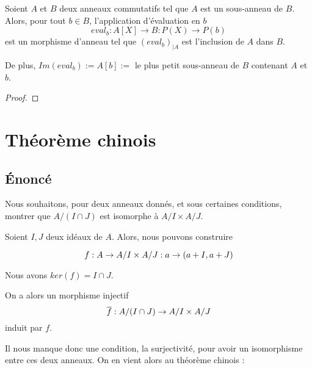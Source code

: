\begin{proposition}
	Soient $A$ et $B$ deux anneaux commutatifs tel que $A$ est un sous-anneau de
	$B$. Alors, pour tout $b \in B$, l'application d'évaluation en $b$
	\begin{equation}
		eval_{b} : A[X] \rightarrow B : P(X) \rightarrow P(b)
	\end{equation}
	est un morphisme d'anneau tel que ${(eval_{b})}_{|A}$ est
	l'inclusion de $A$ dans $B$.

	De plus, $Im(eval_{b}) := A[b] := $ le plus petit sous-anneau de $B$
	contenant $A$ et $b$. %
\end{proposition}

\ifdefined\outputproof
\begin{proof}

\end{proof}
\fi


\section{Théorème chinois}


\subsection{Énoncé}
Nous souhaitons, pour deux anneaux donnés, et sous certaines conditions, montrer
que $A/(I \cap J)$ est isomorphe à $A/I \times A/J$.

Soient $I, J$ deux idéaux de $A$. Alors, nous pouvons construire

\begin{equation}
	f : A \rightarrow A/I \times A/J : a \rightarrow (a + I, a + J)
\end{equation}

Nous avons $ker(f) = I \cap J$.

On a alors un morphisme injectif
\begin{equation}
	\overline{f} : A/(I \cap J) \rightarrow A/I \times A/J
\end{equation}
induit par $f$.

Il nous manque donc une condition, la surjectivité, pour avoir un isomorphisme
entre ces deux anneaux.
On en vient alors au théorème chinois :

